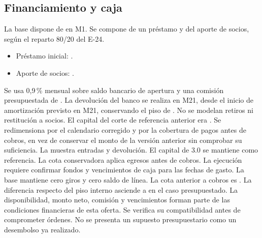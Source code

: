 \subsection{Financiamiento y caja}\label{sec:eco-financiamiento}
La base dispone de  en M1. Se compone de un préstamo y del aporte de socios, según el reparto 80/20 del E-24.
\begin{itemize}
\item Préstamo inicial: .
\item Aporte de socios: .
\end{itemize}
Se usa 0,9\,\% mensual sobre saldo bancario de apertura y una comisión presupuestada de . La devolución del banco se realiza en M21, desde el inicio de amortización previsto en M21, conservando el piso de . No se modelan retiros ni restitución a socios.
El capital del corte de referencia anterior era . Se redimensiona por el calendario corregido y por la cobertura de pagos antes de cobros, en vez de conservar el monto de la versión anterior sin comprobar su suficiencia.
La  muestra entradas y devolución. El capital de 3.0 se mantiene como referencia. La cota conservadora aplica egresos antes de cobros. La ejecución requiere confirmar fondos y vencimientos de caja para las fechas de gasto.
La base mantiene cero giros y cero saldo de línea. La cota anterior a cobros es . La diferencia respecto del piso interno asciende a  en el caso presupuestado. La disponibilidad, monto neto, comisión y vencimientos forman parte de las condiciones financieras de esta oferta. Se verifica su compatibilidad antes de comprometer órdenes. No se presenta un supuesto presupuestario como un desembolso ya realizado.

